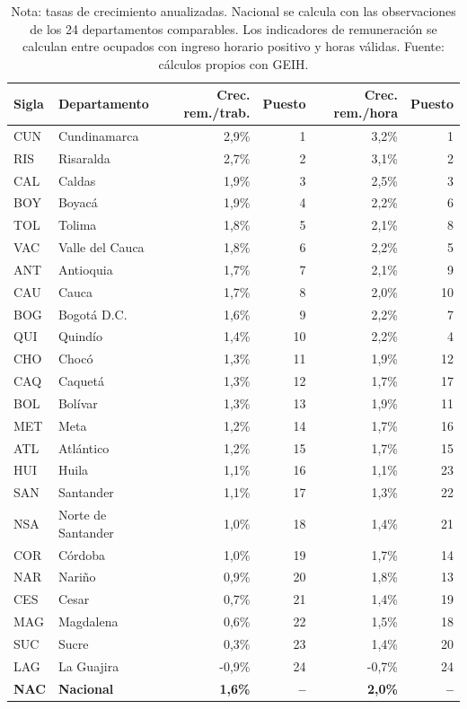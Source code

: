\begin{table}[H]
\centering
\caption{Crecimiento de la remuneración laboral por departamento, 2010--2025}
\label{tab:dept_remuneracion_crecimientos_24}
\scriptsize
\begin{tabular}{@{}llrrrr@{}}
\toprule
Sigla & Departamento & Crec. rem./trab. & Puesto & Crec. rem./hora & Puesto \\
\midrule
CUN & Cundinamarca & 2,9\% & 1 & 3,2\% & 1 \\
RIS & Risaralda & 2,7\% & 2 & 3,1\% & 2 \\
CAL & Caldas & 1,9\% & 3 & 2,5\% & 3 \\
BOY & Boyacá & 1,9\% & 4 & 2,2\% & 6 \\
TOL & Tolima & 1,8\% & 5 & 2,1\% & 8 \\
VAC & Valle del Cauca & 1,8\% & 6 & 2,2\% & 5 \\
ANT & Antioquia & 1,7\% & 7 & 2,1\% & 9 \\
CAU & Cauca & 1,7\% & 8 & 2,0\% & 10 \\
BOG & Bogotá D.C. & 1,6\% & 9 & 2,2\% & 7 \\
QUI & Quindío & 1,4\% & 10 & 2,2\% & 4 \\
CHO & Chocó & 1,3\% & 11 & 1,9\% & 12 \\
CAQ & Caquetá & 1,3\% & 12 & 1,7\% & 17 \\
BOL & Bolívar & 1,3\% & 13 & 1,9\% & 11 \\
MET & Meta & 1,2\% & 14 & 1,7\% & 16 \\
ATL & Atlántico & 1,2\% & 15 & 1,7\% & 15 \\
HUI & Huila & 1,1\% & 16 & 1,1\% & 23 \\
SAN & Santander & 1,1\% & 17 & 1,3\% & 22 \\
NSA & Norte de Santander & 1,0\% & 18 & 1,4\% & 21 \\
COR & Córdoba & 1,0\% & 19 & 1,7\% & 14 \\
NAR & Nariño & 0,9\% & 20 & 1,8\% & 13 \\
CES & Cesar & 0,7\% & 21 & 1,4\% & 19 \\
MAG & Magdalena & 0,6\% & 22 & 1,5\% & 18 \\
SUC & Sucre & 0,3\% & 23 & 1,4\% & 20 \\
LAG & La Guajira & -0,9\% & 24 & -0,7\% & 24 \\
\midrule
\textbf{NAC} & \textbf{Nacional} & \textbf{1,6\%} & \textbf{--} & \textbf{2,0\%} & \textbf{--} \\
\bottomrule
\end{tabular}
\caption*{\footnotesize Nota: tasas de crecimiento anualizadas. Nacional se calcula con las observaciones de los 24 departamentos comparables. Los indicadores de remuneración se calculan entre ocupados con ingreso horario positivo y horas válidas. Fuente: cálculos propios con GEIH.}
\end{table}